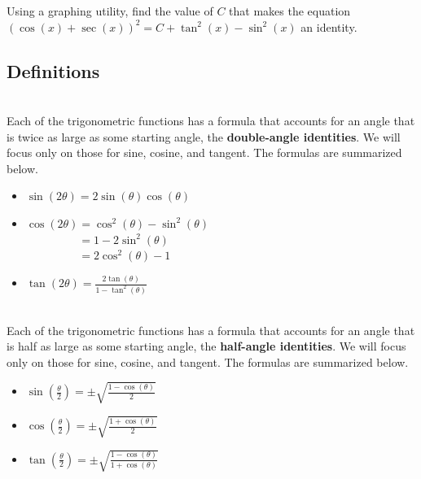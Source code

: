 \begin{myPractice}
	Using a graphing utility, find the value of $C$ that makes the equation $\left(\cos(x)+\sec(x)\right)^2=C+\tan^2(x)-\sin^2(x)$ an identity.
	\vfill
\end{myPractice}

\newpage

\subsection*{Definitions} \label{definitions-section-double-angle-identities}

\begin{myDefinition}~\\[0.5mm]
	Each of the trigonometric functions has a formula that accounts for an angle that is twice as large as some starting angle, the \textbf{double-angle identities}. We will focus only on those for sine, cosine, and tangent. The formulas are summarized below.
		\begin{itemize}
			\item $\sin(2\theta)=2\sin(\theta)\cos(\theta)$
			\vfill
			\item 	$\cos(2\theta)=\cos^2(\theta)-\sin^2(\theta)$\\
					$\phantom{\cos(2\theta)}=1-2\sin^2(\theta)$\\
					$\phantom{\cos(2\theta)}=2\cos^2(\theta)-1$
			\vfill
			\item $\tan(2\theta)=\frac{2\tan(\theta)}{1-\tan^2(\theta)}$
			\vfill
		\end{itemize}
\end{myDefinition}

\begin{myDefinition}~\\[0.5mm]
	Each of the trigonometric functions has a formula that accounts for an angle that is half as large as some starting angle, the \textbf{half-angle identities}. We will focus only on those for sine, cosine, and tangent. The formulas are summarized below.
		\begin{itemize}
			\item $\sin\left(\frac{\theta}{2}\right)=\pm\sqrt{\frac{1-\cos(\theta)}{2}}$
			\vfill
			\item $\cos\left(\frac{\theta}{2}\right)=\pm\sqrt{\frac{1+\cos(\theta)}{2}}$
			\vfill
			\item $\tan\left(\frac{\theta}{2}\right)=\pm\sqrt{\frac{1-\cos(\theta)}{1+\cos(\theta)}}$
			\vfill
		\end{itemize}
\end{myDefinition}

